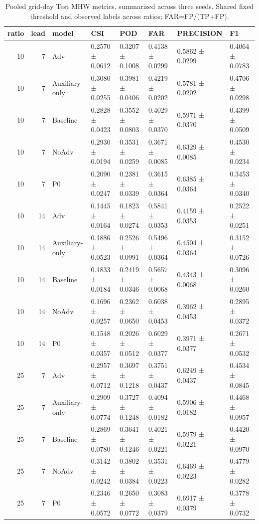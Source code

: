 \begin{table}
\caption{Pooled grid-day Test MHW metrics, summarized across three seeds. Shared fixed threshold and observed labels across ratios; FAR=FP/(TP+FP).}
\label{tab:table4_mhw}
\begin{tabular}{rrllllll}
\toprule
ratio & lead & model & CSI & POD & FAR & PRECISION & F1 \\
\midrule
10 & 7 & Adv & 0.2570 ± 0.0612 & 0.3207 ± 0.1008 & 0.4138 ± 0.0299 & 0.5862 ± 0.0299 & 0.4064 ± 0.0783 \\
10 & 7 & Auxiliary-only & 0.3080 ± 0.0255 & 0.3981 ± 0.0406 & 0.4219 ± 0.0202 & 0.5781 ± 0.0202 & 0.4706 ± 0.0298 \\
10 & 7 & Baseline & 0.2828 ± 0.0423 & 0.3552 ± 0.0803 & 0.4029 ± 0.0370 & 0.5971 ± 0.0370 & 0.4399 ± 0.0509 \\
10 & 7 & NoAdv & 0.2930 ± 0.0194 & 0.3531 ± 0.0259 & 0.3671 ± 0.0085 & 0.6329 ± 0.0085 & 0.4530 ± 0.0234 \\
10 & 7 & P0 & 0.2090 ± 0.0247 & 0.2381 ± 0.0339 & 0.3615 ± 0.0364 & 0.6385 ± 0.0364 & 0.3453 ± 0.0340 \\
10 & 14 & Adv & 0.1445 ± 0.0164 & 0.1823 ± 0.0274 & 0.5841 ± 0.0353 & 0.4159 ± 0.0353 & 0.2522 ± 0.0251 \\
10 & 14 & Auxiliary-only & 0.1886 ± 0.0523 & 0.2526 ± 0.0991 & 0.5496 ± 0.0364 & 0.4504 ± 0.0364 & 0.3152 ± 0.0726 \\
10 & 14 & Baseline & 0.1833 ± 0.0184 & 0.2419 ± 0.0346 & 0.5657 ± 0.0068 & 0.4343 ± 0.0068 & 0.3096 ± 0.0260 \\
10 & 14 & NoAdv & 0.1696 ± 0.0257 & 0.2362 ± 0.0650 & 0.6038 ± 0.0453 & 0.3962 ± 0.0453 & 0.2895 ± 0.0372 \\
10 & 14 & P0 & 0.1548 ± 0.0357 & 0.2026 ± 0.0512 & 0.6029 ± 0.0377 & 0.3971 ± 0.0377 & 0.2671 ± 0.0532 \\
25 & 7 & Adv & 0.2957 ± 0.0712 & 0.3697 ± 0.1218 & 0.3751 ± 0.0437 & 0.6249 ± 0.0437 & 0.4534 ± 0.0845 \\
25 & 7 & Auxiliary-only & 0.2909 ± 0.0774 & 0.3727 ± 0.1248 & 0.4094 ± 0.0182 & 0.5906 ± 0.0182 & 0.4468 ± 0.0957 \\
25 & 7 & Baseline & 0.2869 ± 0.0780 & 0.3641 ± 0.1246 & 0.4021 ± 0.0221 & 0.5979 ± 0.0221 & 0.4420 ± 0.0970 \\
25 & 7 & NoAdv & 0.3142 ± 0.0242 & 0.3802 ± 0.0384 & 0.3531 ± 0.0223 & 0.6469 ± 0.0223 & 0.4779 ± 0.0282 \\
25 & 7 & P0 & 0.2346 ± 0.0572 & 0.2650 ± 0.0772 & 0.3083 ± 0.0379 & 0.6917 ± 0.0379 & 0.3778 ± 0.0732 \\

\end{tabular}
\end{table}
